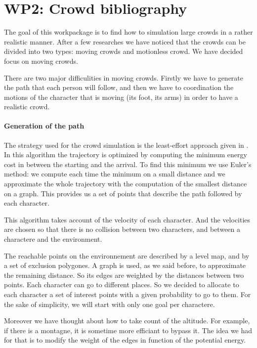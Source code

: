 \section{WP2: Crowd bibliography}

The goal of this workpackage is to find how to simulation large crowds in a rather realistic manner. After a few researches we have noticed that the crowds can be divided into two types: moving crowds and motionless crowd. We have decided focus on moving crowds. 

There are two major difficulities in moving crowds. Firstly we have to generate the path that each person will follow, and then we have to coordination the motions of the character that is moving (its foot, its arms) in order to have a realistic crowd.

\paragraph{Generation of the path}

The strategy used for the crowd simulation is the least-effort approach given in .%
 In this algorithm the trajectory is optimized by computing the minimum energy cost in between the starting and the arrival. To find this minimum we use Euler's method: we compute each time the minimum on a small distance and we approximate the whole trajectory with the computation of the smallest distance on a graph. This provides us a set of points that describe the path followed by each character.

This algorithm takes account of the velocity of each character. And the velocities are chosen so that there is no collision between two characters, and between a charactere and the environment.

The reachable points on the environnement are described by a level map, and by a set of exclusion polygones. A graph is used, as we said before, to approximate the remaining distance. So its edges are weighted by the distances between two points. Each character can go to different places. So we decided to allocate to each character a set of interest points with a given probability to go to them. For the sake of simplicity, we will start with only one goal per charactere.

Moreover we have thought about how to take count of the altitude. For example, if there is a montagne, it is sometime more efficiant to bypass it. The idea we had for that is to modify the weight of the edges in function of the potential energy. 

